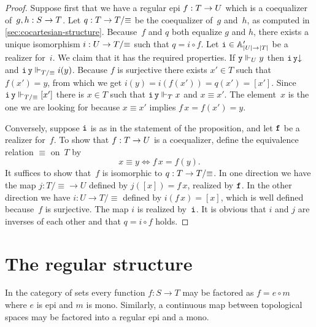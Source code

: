 \begin{proof}
  Suppose first that we have a regular epi $f : \asm{T} \to \asm{U}$
  which is a coequalizer of~$g, h : \asm{S} \to \asm{T}$. Let $q :
  \asm{T} \to \asm{T}/{\equiv}$ be the coequalizer of~$g$ and~$h$, as
  computed in \cref{sec:cocartesian-structure}. Because~$f$ and
  $q$ both equalize $g$ and $h$, there exists a unique isomorphism $i
  : \asm{U} \to \asm{T}/{\equiv}$ such that $q = i \circ f$. Let
  $\R{i} \in \subAtyp{|U| \to |T|}$ be a realizer for~$i$. We claim
  that it has the required properties. If $\R{y} \rz[U] y$ then
  $\defined{\R{i}\,\R{y}}$ and $\R{i}\,\R{y} \rz[T/{\equiv}] i(y)$.
  Because $f$ is surjective there exists $x' \in T$ such that $f(x') =
  y$, from which we get $i(y) = i(f(x')) = q(x') = [x']$. Since
  $\R{i}\,\R{y} \rz[T/{\equiv}] [x']$ there is $x \in T$ such that
  $\R{i}\,\R{y} \rz[T] x$ and $x \equiv x'$. The element~$x$ is the one
  we are looking for because $x \equiv x'$ implies $f\,x = f(x') = y$.

  Conversely, suppose $\R{i}$ is as in the statement of the
  proposition, and let $\R{f}$ be a realizer for~$f$. To show that $f
  : \asm{T} \to \asm{U}$ is a coequalizer, define the equivalence
  relation $\equiv$ on~$T$ by
  \begin{equation*}
    x \equiv y \iff f\,x = f(y).
  \end{equation*}
  It suffices to show that~$f$ is isomorphic to $q : \asm{T} \to
  \asm{T}/{\equiv}$. In one direction we have the map $j : T/{\equiv}
  \to U$ defined by $j([x]) = f\,x$, realized by $\R{f}$. In the other
  direction we have $i : U \to T/{\equiv}$ defined by $i(f\,x) = [x]$,
  which is well defined because~$f$ is surjective. The map $i$ is
  realized by~$\R{i}$. It is obvious that $i$ and $j$ are inverses of
  each other and that $q = i \circ f$ holds.
\end{proof}

\section{The regular structure}
\label{sec:regular-structure}

In the category of sets every function $f : S \to T$ may be factored
as $f = e \circ m$ where $e$ is epi and $m$ is mono. Similarly, a
continuous map between topological spaces may be factored into a
regular epi and a mono.

